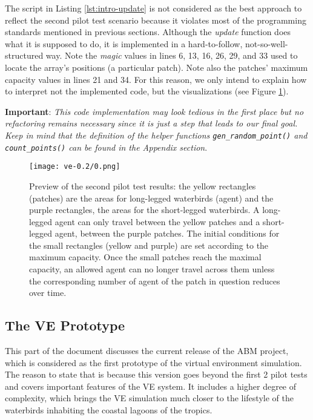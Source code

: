
The script in Listing \ref{lst:intro-update} is not considered as the best approach to reflect the second pilot test scenario because it violates most of the programming standards mentioned in previous sections. Although the \emph{update} function does what it is supposed to do, it is implemented in a hard-to-follow, not-so-well-structured way. Note the \emph{magic} values in lines 6, 13, 16, 26, 29, and 33 used to locate the array's positions (a particular patch). Note also the patches' maximum capacity values in lines 21 and 34. For this reason, we only intend to explain how to interpret not the implemented code, but the visualizations (see Figure \ref{fig:pilot-test-2}).

\noindent
\textbf{Important}: \textit{This code implementation may look tedious in the first place but no refactoring remains necessary since it is just a step that leads to our final goal. Keep in mind that the definition of the helper functions \texttt{gen\_random\_point()} and \texttt{count\_points()} can be found in the Appendix section}.

\begin{figure}[h!]
    \centering
    \texttt{[image: ve-0.2/0.png]}
    \caption{Preview of the second pilot test results: the yellow rectangles (patches) are the areas for long-legged waterbirds (agent) and the purple rectangles, the areas for the short-legged waterbirds. A long-legged agent can only travel between the yellow patches and a short-legged agent, between the purple patches. The initial conditions for the small rectangles (yellow and purple) are set according to the maximum capacity. Once the small patches reach the maximal capacity, an allowed agent can no longer travel across them unless the corresponding number of agent of the patch in question reduces over time.}
    \label{fig:pilot-test-2}
\end{figure}

\subsection{The VE Prototype}
This part of the document discusses the current release of the ABM project, which is considered as the first prototype of the virtual environment simulation. The reason to state that is because this version goes beyond the first 2 pilot tests and covers important features of the VE system. It includes a higher degree of complexity, which brings the VE simulation much closer to the lifestyle of the waterbirds inhabiting the coastal lagoons of the tropics.

